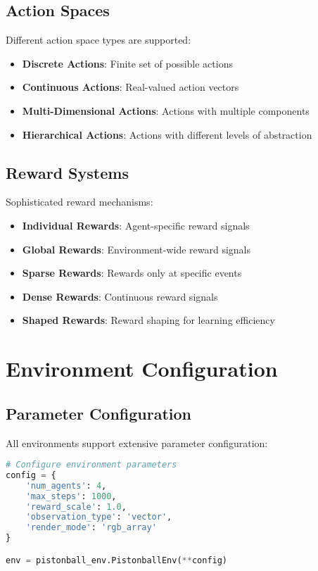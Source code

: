 \subsection{Action Spaces}

Different action space types are supported:

\begin{itemize}
    \item \textbf{Discrete Actions}: Finite set of possible actions
    \item \textbf{Continuous Actions}: Real-valued action vectors
    \item \textbf{Multi-Dimensional Actions}: Actions with multiple components
    \item \textbf{Hierarchical Actions}: Actions with different levels of abstraction
\end{itemize}

\subsection{Reward Systems}

Sophisticated reward mechanisms:

\begin{itemize}
    \item \textbf{Individual Rewards}: Agent-specific reward signals
    \item \textbf{Global Rewards}: Environment-wide reward signals
    \item \textbf{Sparse Rewards}: Rewards only at specific events
    \item \textbf{Dense Rewards}: Continuous reward signals
    \item \textbf{Shaped Rewards}: Reward shaping for learning efficiency
\end{itemize}

\section{Environment Configuration}

\subsection{Parameter Configuration}

All environments support extensive parameter configuration:

\begin{lstlisting}[language=python, caption=Environment Configuration]
# Configure environment parameters
config = {
    'num_agents': 4,
    'max_steps': 1000,
    'reward_scale': 1.0,
    'observation_type': 'vector',
    'render_mode': 'rgb_array'
}

env = pistonball_env.PistonballEnv(**config)
\end{lstlisting}

